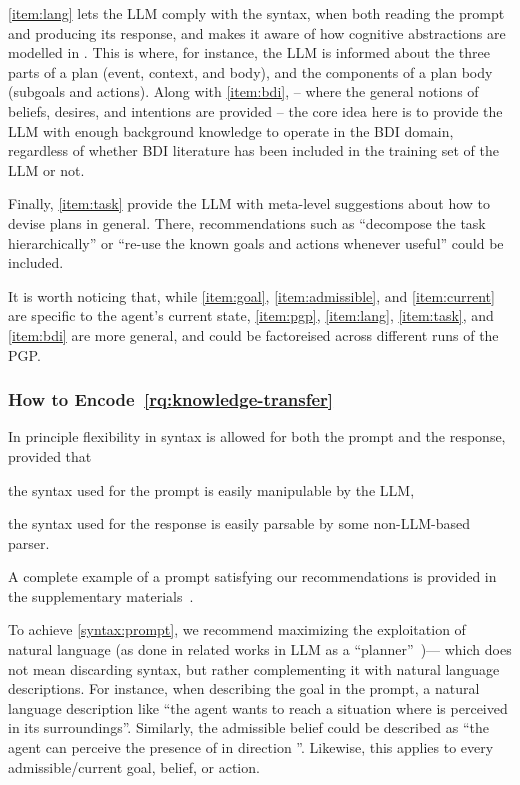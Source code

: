 \ref{item:lang} lets the \ac{LLM} comply with the \agentspeak{} syntax,
when both reading the prompt and producing its response,
and makes it aware of how cognitive abstractions are modelled in \agentspeak{}.
%
This is where,
for instance,
the \ac{LLM} is informed about the three parts of a plan (event, context, and body),
and the components of a plan body (subgoals and actions).
%
Along with \ref{item:bdi},
-- where the general notions of beliefs, desires, and intentions are provided --
the core idea here is to provide the \ac{LLM} with enough background knowledge to operate in the \ac{BDI} domain,
regardless of whether \ac{BDI} literature has been included in the training set of the \ac{LLM} or not.

Finally,
\ref{item:task} provide the \ac{LLM} with meta-level suggestions about how to devise plans in general.
%
There, recommendations such as ``decompose the task hierarchically''
or ``re-use the known goals and actions whenever useful'' could be included.

It is worth noticing that,
while \ref{item:goal}, \ref{item:admissible}, and \ref{item:current} are specific to the agent's current state,
\ref{item:pgp}, \ref{item:lang}, \ref{item:task}, and \ref{item:bdi} are more general,
and could be factoreised across different runs of the \ac{PGP}.

\subsubsection{How to Encode~\ref{rq:knowledge-transfer}}
In principle flexibility in syntax is allowed for both the prompt and the response,
provided that
%
\begin{inlinelist}
    \item\label{syntax:prompt} the syntax used for the prompt is easily manipulable by the \ac{LLM},
    \item\label{syntax:response} the syntax used for the response is easily parsable by some non-\ac{LLM}-based parser.
\end{inlinelist}
%
A complete example of a prompt satisfying our recommendations is provided
in the supplementary materials~\cite{ZenodoSupplementaryMaterial}.
%

To achieve \ref{syntax:prompt},
we recommend maximizing the exploitation of natural language (as done in related works in LLM as a ``planner''~\cite{Murugesan25a})---
which does not mean discarding \agentspeak{} syntax,
but rather complementing it with natural language descriptions.
%
For instance, when describing the goal  in the prompt,
a natural language description like
``the agent wants to reach a situation where  is perceived in its surroundings''.
%
Similarly,
the admissible belief  could be described as
``the agent can perceive the presence of  in direction ''.
%
Likewise, this applies to every admissible/current goal, belief, or action.

